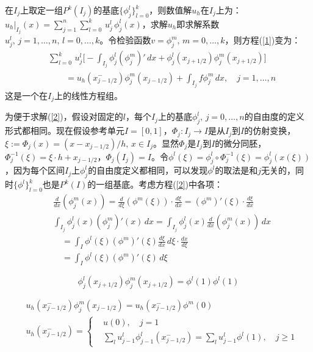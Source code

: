 \documentclass[12pt, a4paper]{ctexart}
\begin{document}
	在$I_j$上取定一组$P^k(I_j)$的基底$\{ \phi_j^l \}_{l=0}^k$，则数值解$u_h$在$I_j$上为：$u_h|_{I_j}(x) = \sum_{j=1}^n \sum_{l=0}^k \, u_j^l \, \phi_j^l(x)$，求解$u_h$即求解系数$u_j^l, \, j=1, \dots, n, \, l=0, \dots, k$。令检验函数$v = \phi_j^m, \, m=0, \dots, k$，则方程(\ref{1})变为：
	\begin{equation}
	\begin{split}
	&\sum_{l=0}^k \, u_j^l \big[ -\int_{I_j} \phi_j^l (\phi_j^m)' \, dx + \phi_j^l(x_{j+1/2}) \phi_j^m (x_{j+1/2}) \big]\\
	& \qquad  = u_h(x_{j-1/2}^-) \phi_j^m (x_{j-1/2}) + \int_{I_j} f \phi_j^m \, dx, \quad  j = 1, \dots, n
	\end{split}
	\label{2}
	\end{equation}
	这是一个在$I_j$上的线性方程组。
	
	为便于求解(\ref{2})，假设对固定的$l$，每个$I_j$上的基底$\phi_j^l, \, j=0, \dots, n$的自由度的定义形式都相同。现在假设参考单元$I=[0,1]$，$\Phi_j : I_j \to I$是从$I_j$到$I$的仿射变换，$\xi := \Phi_j(x) = (x- x_{j-1/2})/h, \, x \in I_j$。显然$\Phi_j$是$I_j$到$I$的微分同胚，$\Phi_j^{-1} (\xi) = \xi \cdot h + x_{j-1/2}$，$\Phi_j(I_j) = I$。令$\phi^l ( \xi ) = \phi_j^l \circ \Phi_j^{-1} (\xi) = \phi_j^l(x(\xi))$，因为每个区间$I_j$上$\phi_j^l$的自由度定义都相同，可以发现$\phi^l$的取法是和$j$无关的，同时$\{ \phi^l \}_{l=0}^k$也是$P^k(I)$的一组基底。考虑方程(\ref{2})中各项：
	\begin{equation}
	\begin{split}
	& \frac{d}{dx} (\phi_j^m (x)) = \frac{d}{d \xi} (\phi^m(\xi)) \cdot \frac{d \xi}{dx} = (\phi^m)' (\xi) \cdot \frac{d\xi}{dx}\\
	& \int_{I_j} \phi_j^l(x) (\phi_j^m)' (x) \, dx = \int_{I_j} \phi_j^l(x) \frac{d}{dx}(\phi_j^m (x)) \, dx\\
	& \quad = \int_{I} \phi^l (\xi) (\phi^m)' (\xi) \frac{d\xi}{dx} \, d\xi \cdot \frac{dx}{d\xi}\\
	& \quad = \int_{I} \phi^l(\xi) (\phi^m)'(\xi) \, d\xi
	\end{split}
	\end{equation}
	
	\begin{equation}
	\phi_j^l(x_{j+1/2}) \phi_j^m(x_{j+1/2}) = \phi^l(1) \phi^l (1)
	\end{equation}
	
	\begin{equation}
	\begin{split}
	& u_h(x_{j-1/2}^-) \phi_j^m(x_{j-1/2}) = u_h(x_{j-1/2}^-) \phi^m(0)\\
	& u_h(x_{j-1/2}^-) = 
	\begin{cases}
	& u(0), \quad j=1\\
	& \sum_l u_{j-1}^l \phi_{j-1}^l (x_{j-1/2}^-) = \sum_l u_{j-1}^l \phi^l(1), \quad j\ge 1
	\end{cases}
	\end{split}
	\label{3}
	\end{equation}
	
\end{document}
